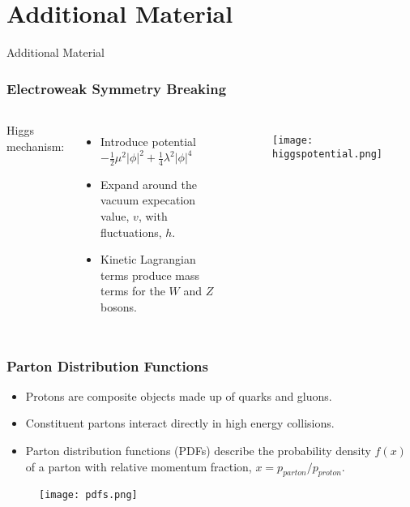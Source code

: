\section*{Additional Material}

\begin{frame}[noframenumbering]
    \centering
    \Huge{Additional Material}
\end{frame}

\begin{frame}[noframenumbering, label=ewsb]
\frametitle{Electroweak Symmetry Breaking}
\centering
{}
\begin{columns}
Higgs mechanism:
\begin{itemize}
    \item Introduce potential $-\frac{1}{2} \mu^2|\phi|^2 +
        \frac{1}{4} \lambda^2 |\phi|^4$
    \item Expand around the vacuum expecation value, $v$, with
        fluctuations, $h$.
    \item Kinetic Lagrangian terms produce mass terms for the $W$ and
        $Z$ bosons.

\end{itemize}
\begin{figure}
\centering
\texttt{[image: higgspotential.png]}
\end{figure}
\end{columns}
\end{frame}

\begin{frame}[noframenumbering, label=pdfs]
\frametitle{Parton Distribution Functions}
\begin{center}
\end{center}
\begin{itemize}
    \item Protons are composite objects made up of quarks and gluons.
    \item Constituent partons interact directly in high energy
        collisions.
    \item Parton distribution functions (PDFs) describe the
        probability density $f(x)$ of a parton with relative momentum
        fraction, $x=p_{parton}/p_{proton}$.
\end{itemize}

\vfill

\begin{figure}
\centering
\texttt{[image: pdfs.png]}
\end{figure}
\end{frame}

